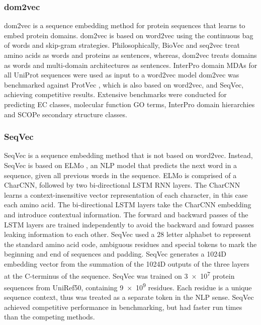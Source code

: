 \subsubsection{dom2vec}

dom2vec \cite{Melidis2020} is a sequence embedding method for protein sequences that learns to embed protein domains.
dom2vec is based on word2vec \cite{Mikolov} using the continuous bag of words and skip-gram strategies.
Philosophically, BioVec and seq2vec treat amino acids as words and proteins as sentences, whereas, dom2vec treats domains as words and multi-domain architectures as sentences.
InterPro domain MDAs for all UniProt sequences were used as input to a word2vec model
dom2vec was benchmarked against ProtVec \cite{Asgari2015}, which is also based on word2vec, and SeqVec, achieving competitive results.
Extensive benchmarks were conducted for predicting EC classes, molecular function GO terms, InterPro domain hierarchies and SCOPe secondary structure classes.

\subsubsection{SeqVec}

SeqVec \cite{Heinzinger2019} is a sequence embedding method that is not based on word2vec.
Instead, SeqVec is based on ELMo \cite{Peters2018}, an NLP model that predicts the next word in a sequence, given all previous words in the sequence.
ELMo is comprised of a CharCNN, followed by two bi-directional LSTM RNN layers.
The CharCNN learns a context-insensitive vector representation of each character, in this case each amino acid.
The bi-directional LSTM layers take the CharCNN embedding and introduce contextual information.
The forward and backward passes of the LSTM layers are trained independently to avoid the backward and foward passes leaking information to each other.
SeqVec used a $28$ letter alphabet to represent the standard amino acid code, ambiguous residues and special tokens to mark the beginning and end of sequences and padding.
SeqVec generates a \num{1024}D embedding vector from the summation of the \num{1024}D outputs of the three layers at the C-terminus of the sequence.
SeqVec was trained on \num{3e7} protein sequences from UniRef50, containing \num{9e9} residues.
Each residue is a unique sequence context, thus was treated as a separate token in the NLP sense.
SeqVec achieved competitive performance in benchmarking, but had faster run times than the competing methods.

